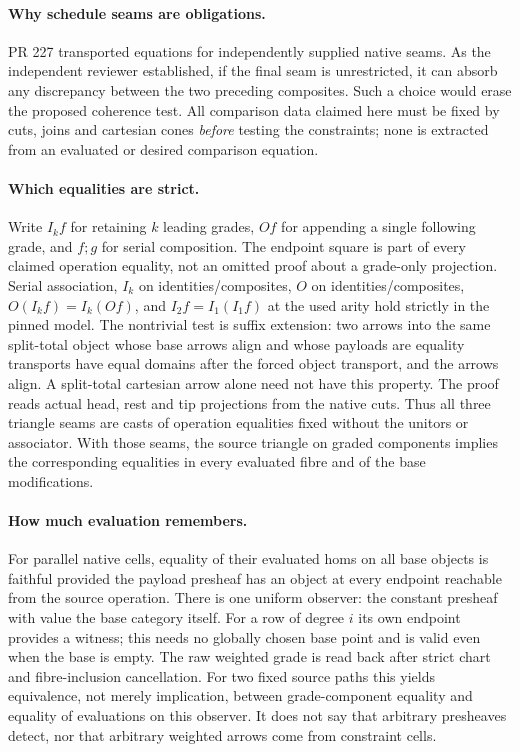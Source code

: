 \documentclass[11pt]{article}
\begin{document}
\paragraph{Why schedule seams are obligations.}
PR 227 transported equations for independently supplied native seams. As the independent reviewer established, if the final seam is unrestricted, it can absorb any discrepancy between the two preceding composites. Such a choice would erase the proposed coherence test. All comparison data claimed here must be fixed by cuts, joins and cartesian cones \emph{before} testing the constraints; none is extracted from an evaluated or desired comparison equation.
\paragraph{Which equalities are strict.}
Write $I_k f$ for retaining $k$ leading grades, $O f$ for appending a single following grade, and $f;g$ for serial composition. The endpoint square is part of every claimed operation equality, not an omitted proof about a grade-only projection. Serial association, $I_k$ on identities/composites, $O$ on identities/composites, $O(I_k f)=I_k(O f)$, and $I_2f=I_1(I_1f)$ at the used arity hold strictly in the pinned model. The nontrivial test is suffix extension: two arrows into the same split-total object whose base arrows align and whose payloads are equality transports have equal domains after the forced object transport, and the arrows align. A split-total cartesian arrow alone need not have this property. The proof reads actual head, rest and tip projections from the native cuts. Thus all three triangle seams are casts of operation equalities fixed without the unitors or associator. With those seams, the source triangle on graded components implies the corresponding equalities in every evaluated fibre and of the base modifications.
\paragraph{How much evaluation remembers.}
For parallel native cells, equality of their evaluated homs on all base objects is faithful provided the payload presheaf has an object at every endpoint reachable from the source operation. There is one uniform observer: the constant presheaf with value the base category itself. For a row of degree $i$ its own endpoint provides a witness; this needs no globally chosen base point and is valid even when the base is empty. The raw weighted grade is read back after strict chart and fibre-inclusion cancellation. For two fixed source paths this yields equivalence, not merely implication, between grade-component equality and equality of evaluations on this observer. It does not say that arbitrary presheaves detect, nor that arbitrary weighted arrows come from constraint cells.
\end{document}
